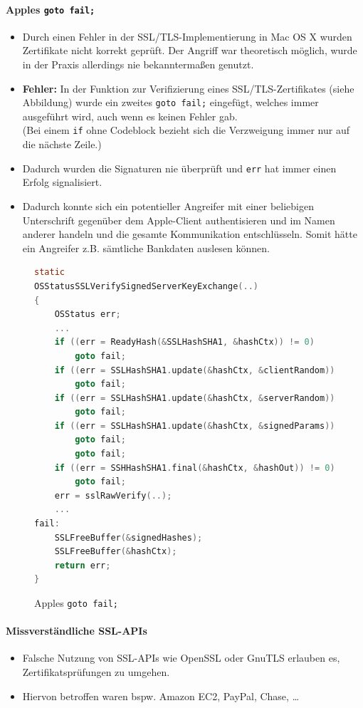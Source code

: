 \documentclass[a4paper, 11pt, accentcolor = tud3b]{tudreport}
\begin{document}
	                \paragraph{Apples \texttt{goto fail;}}
		                \begin{itemize}
		                	\item Durch einen Fehler in der SSL/TLS-Implementierung in Mac OS X wurden Zertifikate nicht korrekt geprüft. Der Angriff war theoretisch möglich, wurde in der Praxis allerdings nie bekanntermaßen genutzt.
		                	\item \textbf{Fehler:} In der Funktion zur Verifizierung eines SSL/TLS-Zertifikates (siehe Abbildung) wurde ein zweites \texttt{goto fail;} eingefügt, welches immer ausgeführt wird, auch wenn es keinen Fehler gab. \\ (Bei einem \texttt{if} ohne Codeblock bezieht sich die Verzweigung immer nur auf die nächste Zeile.)
		                	\item Dadurch wurden die Signaturen nie überprüft und \texttt{err} hat immer einen Erfolg signalisiert.
		                	\item Dadurch konnte sich ein potentieller Angreifer mit einer beliebigen Unterschrift gegenüber dem Apple-Client authentisieren und im Namen anderer handeln und die gesamte Kommunikation entschlüsseln. Somit hätte ein Angreifer z.B. sämtliche Bankdaten auslesen können.
		                \end{itemize}
		                \begin{figure}[H]
		                	\centering
		                	\begin{lstlisting}[language = C]
static
OSStatusSSLVerifySignedServerKeyExchange(..)
{
	OSStatus err;
	...
	if ((err = ReadyHash(&SSLHashSHA1, &hashCtx)) != 0)
		goto fail;
	if ((err = SSLHashSHA1.update(&hashCtx, &clientRandom)) != 0)
		goto fail;
	if ((err = SSLHashSHA1.update(&hashCtx, &serverRandom)) != 0)
		goto fail;
	if ((err = SSLHashSHA1.update(&hashCtx, &signedParams)) != 0)
		goto fail;
		goto fail;
	if ((err = SSHHashSHA1.final(&hashCtx, &hashOut)) != 0)
		goto fail;
	err = sslRawVerify(..);
	...
fail:
	SSLFreeBuffer(&signedHashes);
	SSLFreeBuffer(&hashCtx);
	return err;
}
\end{lstlisting}
		                	\caption{Apples \texttt{goto fail;}}
		                \end{figure}
	                
	                \paragraph{Missverständliche SSL-APIs}
		                \begin{itemize}
		                	\item Falsche Nutzung von SSL-APIs wie OpenSSL oder GnuTLS erlauben es, Zertifikatsprüfungen zu umgehen.
		                	\item Hiervon betroffen waren bspw. Amazon EC2, PayPal, Chase, \dots
		                \end{itemize}
	                
\end{document}
